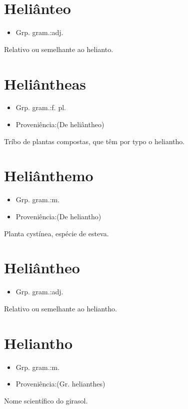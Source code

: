 \documentclass{article}
\begin{document}
\section{Heliânteo}
\begin{itemize}
\item {Grp. gram.:adj.}
\end{itemize}
Relativo ou semelhante ao helianto.
\section{Heliântheas}
\begin{itemize}
\item {Grp. gram.:f. pl.}
\end{itemize}
\begin{itemize}
\item {Proveniência:(De \textunderscore heliântheo\textunderscore )}
\end{itemize}
Tríbo de plantas compostas, que têm por typo o heliantho.
\section{Heliânthemo}
\begin{itemize}
\item {Grp. gram.:m.}
\end{itemize}
\begin{itemize}
\item {Proveniência:(De \textunderscore heliantho\textunderscore )}
\end{itemize}
Planta cystínea, espécie de esteva.
\section{Heliântheo}
\begin{itemize}
\item {Grp. gram.:adj.}
\end{itemize}
Relativo ou semelhante ao heliantho.
\section{Heliantho}
\begin{itemize}
\item {Grp. gram.:m.}
\end{itemize}
\begin{itemize}
\item {Proveniência:(Gr. \textunderscore helianthes\textunderscore )}
\end{itemize}
Nome scientífico do girasol.
\end{document}
